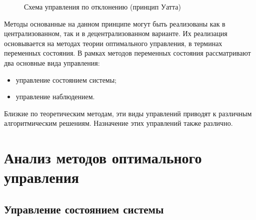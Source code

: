 \begin{figure}[!h]

\centering
{} 
\caption{Схема управления по отклонению (принцип Уатта)}
\label{fig:uatta}
\end{figure}

Методы основанные на данном принципе могут быть реализованы как в централизованном, так и в децентрализованном варианте.
Их реализация основывается на методах теории оптимального управления, в терминах переменных состояния.
В рамках методов переменных состояния рассматривают два основные вида управления:
\begin{itemize}
 \item управление состоянием системы;
 \item управление наблюдением.
\end{itemize}

Близкие по теоретическим методам, эти виды управлений приводят к различным алгоритмическим решениям.
Назначение этих управлений также различно.

\section{Анализ методов оптимального управления}

\subsection{Управление состоянием системы}


